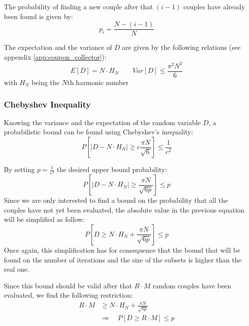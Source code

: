 The probability of finding a new couple after that $(i-1)$ couples have already been found is given by:
\begin{equation}
    \label{eqn:pti}
    p_i = \frac{N - (i-1)}{N}
\end{equation}

The expectation and the variance of $D$ are given by the following relations (see appendix \ref{app:coupon_collector}):
\begin{equation}
    E[D] = N\cdot H_N    \qquad Var[D] \le \frac{\pi ^2N^2}{6}
    \label{eqn:var_exp_D}
\end{equation}
with $H_N$ being the $N$th harmonic number

\subsubsection{Chebyshev Inequality}
Knowing the variance and the expectation of the random variable $D$, a probabilistic bound can be found using Chebyshev's inequality:
\begin{equation}
    \label{eqn:chebshev}
    P[\lvert D - N\cdot H_N\lvert \ge c \frac{\pi N }{\sqrt{6}}] \le \frac{1}{c^2}
\end{equation}

By setting $p = \frac{1}{c^2}$ the desired upper bound probability:
\begin{equation}
    \label{eqn:prob_cheb_with_abs}
    P[\lvert D -N \cdot H_N\lvert \ge \frac{\pi N}{\sqrt{6p}}] \le p
\end{equation}
Since we are only interested to find a bound on the probability that all the couples have not yet been evaluated, the absolute value in the previous equation will be simplified as follow:
\begin{equation}
    \label{eqn:prob_cheb}
    P[D \ge N \cdot H_N +\frac{\pi N}{\sqrt{6p}}] \le p
\end{equation}
Once again, this simplification has for consequence that the bound that will be found on the number of iterations and the size of the subsets is higher than the real one.

Since this bound should be valid after that $R\cdot M$ random couples have been evaluated, we find the following restriction:
\begin{equation}
    \label{prob_bound}
    \begin{split}
    R\cdot M  & \ge N\cdot H_N + \frac{\pi N}{\sqrt{6p}}  \\
        & \Rightarrow \quad P[D \ge R\cdot M] \le p
    \end{split}
\end{equation}

